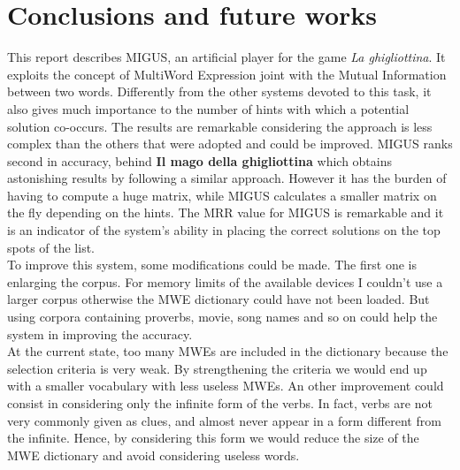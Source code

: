 \documentclass[twoside,twocolumn]{article}
\begin{document}
	\section{Conclusions and future works}
	This report describes MIGUS, an artificial player for the game \textit{La ghigliottina}. It exploits the concept of MultiWord Expression joint with the Mutual Information between two words. Differently from the other systems devoted to this task, it also gives much importance to the number of hints with which a potential solution co-occurs. The results are remarkable considering the approach is less complex than the others that were adopted and could be improved. MIGUS ranks second in accuracy, behind \textbf{Il mago della ghigliottina} which obtains astonishing results by following a similar approach. However it has the burden of having to compute a huge matrix, while MIGUS calculates a smaller matrix on the fly depending on the hints. The MRR value for MIGUS is remarkable and it is an indicator of the system's ability in placing the correct solutions on the top spots of the list.  \\
	To improve this system, some modifications could be made. The first one is enlarging the corpus. For memory limits of the available devices I couldn't use a larger corpus otherwise the MWE dictionary could have not been loaded. But using corpora containing proverbs, movie, song names and so on could help the system in improving the accuracy.\\
	At the current state, too many MWEs are included in the dictionary because the selection criteria is very weak. By strengthening the criteria we would end up with a smaller vocabulary with less useless MWEs. An other improvement could consist in considering only the infinite form of the verbs. In fact, verbs are not very commonly given as clues, and almost never appear in a form different from the infinite. Hence, by considering this form we would reduce the size of the MWE dictionary and avoid considering useless words. 
\end{document}
